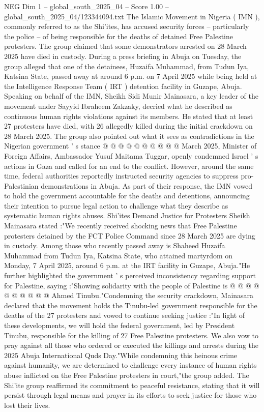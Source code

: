 \begin{textsample}{NEG Dim 1 – global\_south\_2025\_04 – Score 1.00 – global\_south\_2025\_04/123344094.txt}  \label{ex:f1_neg_168}
The Islamic Movement in Nigeria ( IMN ), commonly referred to as the Shi'ites, has accused security forces -- particularly the police -- of being responsible for the deaths of detained Free Palestine protesters.
The group claimed that some demonstrators arrested on 28 March 2025 have died in custody.
During a press briefing in Abuja on Tuesday, the group alleged that one of the detainees, Huzaifa Muhammad, from Tudun Iya, Katsina State, passed away at around 6 p.m. on 7 April 2025 while being held at the Intelligence Response Team ( IRT ) detention facility in Guzape, Abuja.
Speaking on behalf of the IMN, Sheikh Sidi Munir Mainasara, a key leader of the movement under Sayyid Ibraheem Zakzaky, decried what he described as continuous human rights violations against its members.
He stated that at least 27 protesters have died, with 26 allegedly killed during the initial crackdown on 28 March 2025.
The group also pointed out what it sees as contradictions in the Nigerian government ' s stance @ @ @ @ @ @ @ @ @ @ March 2025, Minister of Foreign Affairs, Ambassador Yusuf Maitama Tuggar, openly condemned Israel ' s actions in Gaza and called for an end to the conflict.
However, around the same time, federal authorities reportedly instructed security agencies to suppress pro-Palestinian demonstrations in Abuja.
As part of their response, the IMN vowed to hold the government accountable for the deaths and detentions, announcing their intention to pursue legal action to challenge what they describe as systematic human rights abuses.
Shi'ites Demand Justice for Protesters Sheikh Mainasara stated :"We recently received shocking news that Free Palestine protesters detained by the FCT Police Command since 28 March 2025 are dying in custody.
Among those who recently passed away is Shaheed Huzaifa Muhammad from Tudun Iya, Katsina State, who attained martyrdom on Monday, 7 April 2025, around 6 p.m. at the IRT facility in Guzape, Abuja."He further highlighted the government ' s perceived inconsistency regarding support for Palestine, saying :"Showing solidarity with the people of Palestine is @ @ @ @ @ @ @ @ @ @ Ahmed Tinubu."Condemning the security crackdown, Mainasara declared that the movement holds the Tinubu-led government responsible for the deaths of the 27 protesters and vowed to continue seeking justice :"In light of these developments, we will hold the federal government, led by President Tinubu, responsible for the killing of 27 Free Palestine protesters.
We also vow to pray against all those who ordered or executed the killings and arrests during the 2025 Abuja International Quds Day."While condemning this heinous crime against humanity, we are determined to challenge every instance of human rights abuse inflicted on the Free Palestine protesters in court,"the group added.
The Shi'ite group reaffirmed its commitment to peaceful resistance, stating that it will persist through legal means and prayer in its efforts to seek justice for those who lost their lives.

\end{textsample}
